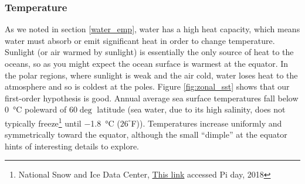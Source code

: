 \documentclass[amstex,12pt]{book}
\begin{document}
\subsubsection{Temperature}\label{modern_sst}
As we noted in section \ref{water_emp}, water has a high heat capacity, which means water must absorb or emit significant heat in order to change temperature. Sunlight (or air warmed by sunlight) is essentially the only source of heat to the oceans, so as you might expect the ocean surface is warmest at the equator. In the polar regions, where sunlight is weak and the air cold, water loses heat to the atmosphere and so is coldest at the poles. Figure \ref{fig:zonal_sst} shows that our first-order hypothesis is good. Annual average sea surface temperatures fall below \SI{0}{\celsius} poleward of $60 \deg$ latitude (sea water, due to its high salinity, does not typically freeze\footnote{National Snow and Ice Data Center, \href{https://nsidc.org/cryosphere/seaice/characteristics/brine_salinity.html}{This link} accessed Pi day, 2018} until \SI{-1.8}{\celsius} ($26^{\circ}$F)). Temperatures increase uniformly and symmetrically toward the equator, although the small ``dimple'' at the equator hints of interesting details to explore.\\
\end{document}
